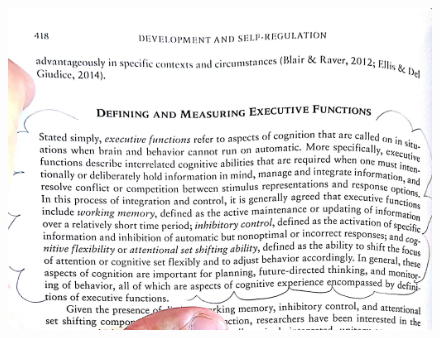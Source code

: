 \documentclass{beamer}%
\begin{document}
\begin{frame}


%
%
%
%

\begin{figure}
   \vspace{-0.2cm}  %
   \setlength{\belowcaptionskip}{-0.4cm}   %
   \setlength{\abovecaptionskip}{0.4cm}   %
  \centering%
    \hspace{0.05cm}\includegraphics[width=0.8\linewidth]{Distortions.jpg}\\
\label{fig:fastdata}
\end{figure}


\end{frame}
\end{document}
